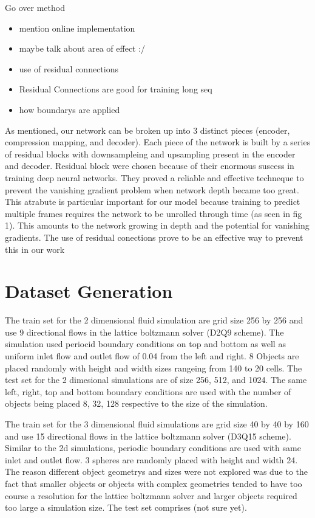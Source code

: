 \documentclass{article}
\begin{document}
Go over method
\begin{itemize}
  \item mention online implementation
  \item maybe talk about area of effect :/
  \item use of residual connections
  \item Residual Connections are good for training long seq
  \item how boundarys are applied
\end{itemize}

As mentioned, our network can be broken up into 3 distinct pieces (encoder, compression mapping, and decoder). Each piece of the network is built by a series of residual blocks with downsampleing and upsampling present in the encoder and decoder. Residual block were chosen because of their enormous suscess in training deep neural networks. They proved a reliable and effective techneque to prevent the vanishing gradient problem when network depth became too great. This atrabute is particular important for our model because training to predict multiple frames requires the network to be unrolled through time (as seen in fig 1). This amounts to the network growing in depth and the potential for vanishing gradients. The use of residual conections prove to be an effective way to prevent this in our work

\section{Dataset Generation}

The train set for the 2 dimensional fluid simulation are grid size 256 by 256 and use 9 directional flows in the lattice boltzmann solver (D2Q9 scheme). The simulation used periocid boundary conditions on top and bottom as well as uniform inlet flow and outlet flow of 0.04 from the left and right. 8 Objects are placed randomly with height and width sizes rangeing from 140 to 20 cells. The test set for the 2 dimesional simulations are of size 256, 512, and 1024. The same left, right, top and bottom boundary conditions are used with the number of objects being placed 8, 32, 128 respective to the size of the simulation. 

The train set for the 3 dimensional fluid simulations are grid size 40 by 40 by 160 and use 15 directional flows in the lattice boltzmann solver (D3Q15 scheme). Similar to the 2d simulations, periodic boundary conditions are used with same inlet and outlet flow. 3 spheres are randomly placed with height and width 24. The reason different object geometrys and sizes were not explored was due to the fact that smaller objects or objects with complex geometries tended to have too course a resolution for the lattice boltzmann solver and larger objects required too large a simulation size. The test set comprises (not sure yet).
\end{document}

